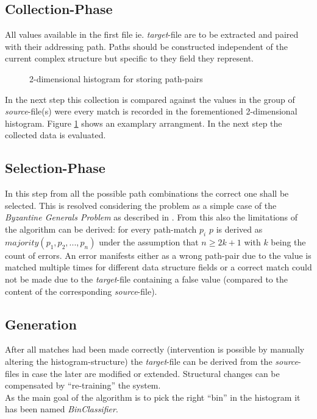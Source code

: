 \documentclass[conference]{IEEEtran}
\begin{document}
\subsection{Collection-Phase}
All values available in the first file ie. \textit{target}-file are to be extracted and
paired with their addressing path. Paths should be constructed independent of the current
complex structure but specific to they field they represent.
\begin{figure}[h]
  \centering
 \caption{2-dimensional histogram for storing path-pairs}
 \label{classifier_table}
\end{figure}
In the next step this collection is compared against the values in the group of
\textit{source}-file(s) were every match is recorded in the forementioned 2-dimensional histogram.
Figure \ref{classifier_table} shows an examplary arrangment. In the next step the collected data
is evaluated.

\subsection{Selection-Phase}
In this step from all the possible path combinations the correct one shall be selected. This is
resolved considering the problem as a simple case of the \textit{Byzantine Generals Problem} as
described in \cite{lamport:byzantine}. From this also the limitations of the algorithm can be derived:
for every path-match $p_i$ $p$ is derived as $majority(p_1, p_2, ...,p_n)$ under the assumption that
$n \geq 2k + 1$ with $k$ being the count of errors. An error manifests either as a wrong path-pair due
to the value is matched multiple times for different data structure fields or a correct match could
not be made due to the \textit{target}-file containing a false value (compared to the content of the
corresponding \textit{source}-file).

\subsection{Generation}
After all matches had been made correctly (intervention is possible by manually altering the
histogram-structure) the \textit{target}-file can be derived from the \textit{source}-files in
case the later are modified or extended. Structural changes can be compensated by ``re-training''
the system.\\As the main goal of the algorithm is to pick the right ``bin'' in the histogram it
has been named \textit{BinClassifier}.
\end{document}
